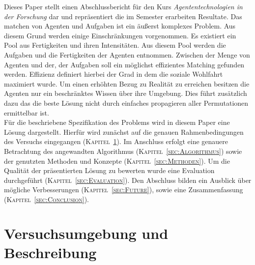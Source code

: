 \documentclass[fleqn,10pt]{article} %
\newcommand{\ChapterCite}[1]{\textsc{Kapitel~\ref{#1}}}
\begin{document}

Dieses Paper stellt einen Abschlussbericht für den Kurs \textit{Agententechnologien in der Forschung} dar und repräsentiert die im Semester erarbeiten Resultate. Das matchen von Agenten und Aufgaben ist ein äußerst komplexes Problem. Aus diesem Grund werden einige Einschränkungen vorgenommen. Es existiert ein Pool aus Fertigkeiten und ihren Intensitäten. Aus diesem Pool werden die Aufgaben und die Fertigkeiten der Agenten entnommen. Zwischen der Menge von Agenten und der, der Aufgaben soll ein möglichst effizientes Matching gefunden werden. Effizienz definiert hierbei der Grad in dem die soziale Wohlfahrt maximiert wurde. Um einen erhöhten Bezug zu Realität zu erreichen besitzen die Agenten nur ein beschränktes Wissen über ihre Umgebung. Dies führt zusätzlich dazu das die beste Lösung nicht durch einfaches propagieren aller Permutationen ermittelbar ist. \\
Für die beschriebene Spezifikation des Problems wird in diesem Paper eine Lösung dargestellt. Hierfür wird zunächst auf die genauen Rahmenbedingungen des Versuchs eingegangen (\ChapterCite{sec:Umgebung}). Im Anschluss erfolgt eine genauere Betrachtung des angewandten Algorithmus (\ChapterCite{sec:Algorithmus}) sowie der genutzten Methoden und Konzepte (\ChapterCite{sec:Methoden}). Um die Qualität der präsentierten Lösung zu bewerten wurde eine Evaluation durchgeführt (\ChapterCite{sec:Evaluation}). Den Abschluss bilden ein Ausblick über mögliche Verbesserungen (\ChapterCite{sec:Future}), sowie eine Zusammenfassung (\ChapterCite{sec:Conclusion}). 


\section{Versuchsumgebung und Beschreibung}
\label{sec:Umgebung}
\end{document}
